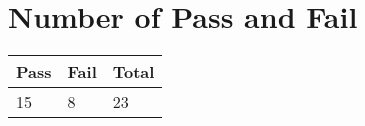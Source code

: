 \section{Number of Pass and Fail}
\setlength{\parindent}{4em}
\setlength{\parskip}{1em}
\renewcommand{\baselinestretch}{2.0}
\begin{turn}{-0}
\begin{tabular}{ |p{2cm}| |p{2cm}| |p{2cm}|}
\hline 
\cellcolor{red}\textbf{Pass} & \cellcolor{green}\textbf{Fail} & \cellcolor{yellow}\textbf{Total}\\ \hline
15 & 8 & 23 \\ \hline

\end{tabular}
\end{turn}
